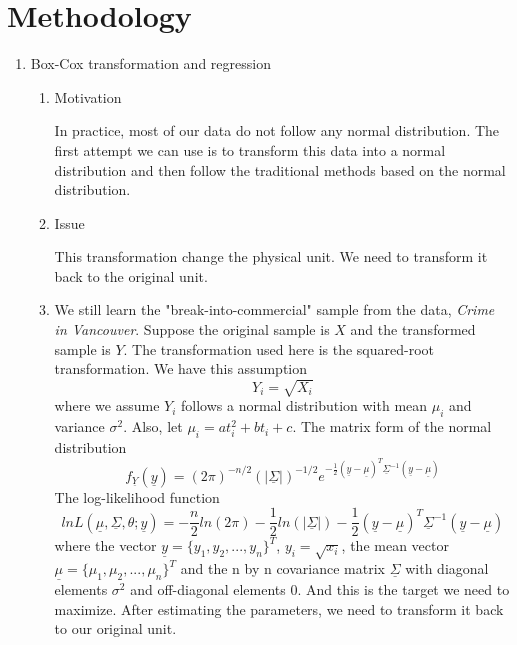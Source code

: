 \section{Methodology}
\begin{enumerate}
	\item Box-Cox transformation and regression
		\begin{enumerate}
			\item Motivation
			\par In practice, most of our data do not follow any normal distribution. The first attempt we can use is to transform this data into a normal distribution and then follow the traditional methods based on the normal distribution.
			\item Issue
			\par  This transformation change the physical unit. We need to transform it back to the original unit. 
			\item We still learn the "break-into-commercial" sample from the data, \textit{Crime in Vancouver}.
			Suppose the original sample is $X$ and the transformed sample is $Y$. The transformation used here is the squared-root transformation. We have this assumption
			\begin{equation*}
			Y_i = \sqrt{X_i}
			\end{equation*}
			where we assume $Y_i$ follows a normal distribution with mean $\mu_i$ and variance $\sigma^2$. Also, let $\mu_i = at_i^2 + b t_i + c$. The matrix form of the normal distribution
			\begin{equation*}
			f_{\underline{Y}}(\underline{y}) = (2\pi)^{-n/2}(|\underline{\Sigma}|)^{-1/2}e^{-\frac{1}{2} (\underline{y} - \underline{\mu})^{T} \underline{\Sigma}^{-1} (\underline{y} - \underline{\mu}) }
			\end{equation*}
			The log-likelihood function
			\begin{equation*}
			lnL(\underline{\mu}, \underline{\Sigma}, \theta; \underline{y}) = -\frac{n}{2}ln(2\pi) - \frac{1}{2}ln( |\underline{\Sigma}| ) -\frac{1}{2} (\underline{y} - \underline{\mu})^{T} \underline{\Sigma}^{-1} (\underline{y} - \underline{\mu})
			\end{equation*}
			where the vector $\underline{y} = \{ y_1, y_2, ..., y_n \}^T$, $y_i = \sqrt{x_i}$, the mean vector $\underline{\mu} = \{ \mu_1, \mu_2, ..., \mu_ n \}^T$ and the n by n covariance matrix $\underline{\Sigma}$ with diagonal elements $\sigma^2$ and off-diagonal elements $0$. And this is the target we need to maximize. After estimating the parameters, we need to transform it back to our original unit.

\end{enumerate}
\end{enumerate}
